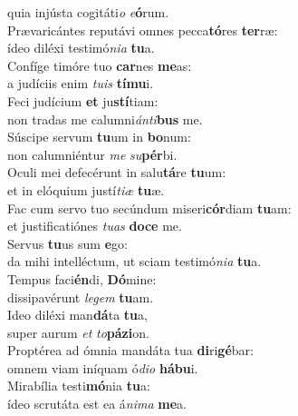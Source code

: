 \evenverse quia injústa cogitáti\textit{o} \textit{e}\textbf{ó}rum.\\
\oddverse Prævaricántes reputávi omnes pecca\textbf{tó}res \textbf{ter}ræ:~\*\\
\oddverse ídeo diléxi testimó\textit{ni}\textit{a} \textbf{tu}a.\\
\evenverse Confíge timóre tuo \textbf{car}nes \textbf{me}as:~\*\\
\evenverse a judíciis enim \textit{tu}\textit{is} \textbf{tí}\textbf{mu}i.\\
\oddverse Feci judícium \textbf{et} ju\textbf{stí}tiam:~\*\\
\oddverse non tradas me calumni\textit{án}\textit{ti}\textbf{bus} me.\\
\evenverse Súscipe servum \textbf{tu}um in \textbf{bo}num:~\*\\
\evenverse non calumniéntur \textit{me} \textit{su}\textbf{pér}bi.\\
\oddverse Oculi mei defecérunt in salu\textbf{tá}re \textbf{tu}um:~\*\\
\oddverse et in elóquium justí\textit{ti}\textit{æ} \textbf{tu}æ.\\
\evenverse Fac cum servo tuo secúndum miseri\textbf{cór}diam \textbf{tu}am:~\*\\
\evenverse et justificatiónes \textit{tu}\textit{as} \textbf{do}\textbf{ce} me.\\
\oddverse Servus \textbf{tu}us sum \textbf{e}go:~\*\\
\oddverse da mihi intelléctum, ut sciam testimó\textit{ni}\textit{a} \textbf{tu}a.\\
\evenverse Tempus faci\textbf{én}di, \textbf{Dó}mine:~\*\\
\evenverse dissipavérunt \textit{le}\textit{gem} \textbf{tu}am.\\
\oddverse Ideo diléxi man\textbf{dá}ta \textbf{tu}a,~\*\\
\oddverse super aurum \textit{et} \textit{to}\textbf{pá}\textbf{zi}on.\\
\evenverse Proptérea ad ómnia mandáta tua \textbf{di}ri\textbf{gé}bar:~\*\\
\evenverse omnem viam iníquam ó\textit{di}\textit{o} \textbf{há}\textbf{bu}i.\\
\oddverse Mirabília testi\textbf{mó}nia \textbf{tu}a:~\*\\
\oddverse ídeo scrutáta est ea á\textit{ni}\textit{ma} \textbf{me}a.\\
